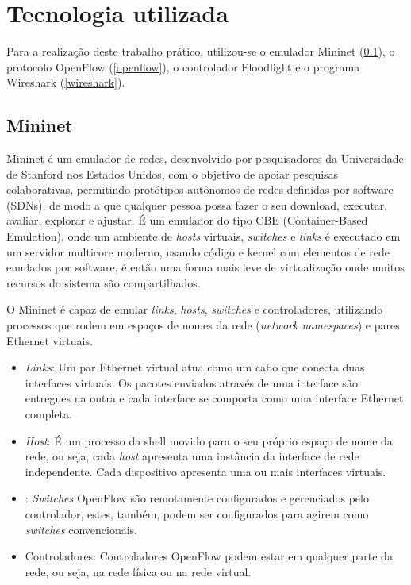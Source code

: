 \section*{Tecnologia utilizada}

Para a realização deste trabalho prático, utilizou-se o emulador Mininet (\ref{mininet}), o protocolo OpenFlow (\ref{openflow}), o controlador Floodlight e o programa Wireshark (\ref{wireshark}).

\subsection{Mininet} \label{mininet}

Mininet é um emulador de redes, desenvolvido por pesquisadores da Universidade de Stanford nos Estados Unidos, com o objetivo de apoiar pesquisas colaborativas, permitindo protótipos autônomos de redes definidas por software (SDNs), de modo a que qualquer pessoa possa fazer o seu download, executar, avaliar, explorar e ajustar.
É um emulador do tipo CBE (Container-Based Emulation), onde um ambiente de \textit{hosts} virtuais, \textit{switches} e \textit{links} é executado em um servidor multicore moderno, usando código e kernel com elementos de rede emulados por software, é então uma forma mais leve de virtualização onde muitos recursos do sistema são compartilhados. 

O Mininet é capaz de emular \textit{links}, \textit{hosts}, \textit{switches} e controladores, utilizando processos que rodem em espaços de nomes da rede (\textit{network namespaces}) e pares Ethernet virtuais.

\begin{itemize}

	\item \textit{Links}: Um par Ethernet virtual atua como um cabo que conecta duas interfaces virtuais. Os pacotes enviados através de uma interface são entregues na outra e cada interface se comporta como uma interface Ethernet completa.
	
	\item \textit{Host}: É um processo da shell movido para o seu próprio espaço de nome da rede, ou seja, cada \textit{host} apresenta uma instância da interface de rede independente. Cada dispositivo apresenta uma ou mais interfaces virtuais.
	
	\item {}: \textit{Switches} OpenFlow são remotamente configurados e gerenciados pelo controlador, estes, também, podem ser configurados para agirem como \textit{switches} convencionais.
	
	\item Controladores: Controladores OpenFlow podem estar em qualquer parte da rede, ou seja, na rede física ou na rede virtual.

\end{itemize}

